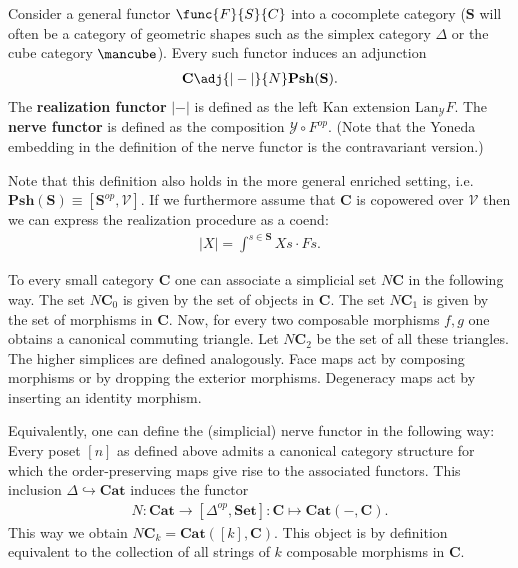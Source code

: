     \begin{construct}
        Consider a general functor $\func{F}{S}{C}$ into a cocomplete category ($\mathbf{S}$ will often be a category of geometric shapes such as the simplex category $\Delta$ or the cube category $\mbox{\mancube}$). Every such functor induces an adjunction
        \begin{gather}
            \mathbf{C}\adj{|-|}{N}\mathbf{Psh}(\mathbf{S}).
        \end{gather}
        The \textbf{realization functor} $|-|$ is defined as the left Kan extension $\text{Lan}_{\mathcal{Y}}F$. The \textbf{nerve functor} is defined as the composition $\mathcal{Y}\circ F^{op}$. (Note that the Yoneda embedding in the definition of the nerve functor is the contravariant version.)

        Note that this definition also holds in the more general enriched setting, i.e. $\mathbf{Psh}(\mathbf{S})\equiv[\mathbf{S}^{op}, \mathcal{V}]$. If we furthermore assume that $\mathbf{C}$ is copowered over $\mathcal{V}$ then we can express the realization procedure as a coend:
        \begin{gather}
            |X| = \int^{s\in\mathbf{S}}Xs\cdot Fs.
        \end{gather}
    \end{construct}

    \begin{example}\label{sheaf:nerve}
        To every small category \textbf{C} one can associate a simplicial set $N\mathbf{C}$ in the following way. The set $N\mathbf{C}_0$ is given by the set of objects in $\mathbf{C}$. The set $N\mathbf{C}_1$ is given by the set of morphisms in $\mathbf{C}$. Now, for every two composable morphisms $f, g$ one obtains a canonical commuting triangle. Let $N\mathbf{C}_2$ be the set of all these triangles. The higher simplices are defined analogously. Face maps act by composing morphisms or by dropping the exterior morphisms. Degeneracy maps act by inserting an identity morphism.

        Equivalently, one can define the (simplicial) nerve functor in the following way: Every poset $[n]$ as defined above admits a canonical category structure for which the order-preserving maps give rise to the associated functors. This inclusion $\Delta\hookrightarrow\mathbf{Cat}$ induces the functor
        \begin{gather}
            N:\textbf{Cat}\rightarrow[\Delta^{op}, \textbf{Set}]:\mathbf{C}\mapsto\mathbf{Cat}(-, \mathbf{C}).
        \end{gather}
        This way we obtain $N\mathbf{C}_k=\mathbf{Cat}([k], \mathbf{C})$. This object is by definition equivalent to the collection of all strings of $k$ composable morphisms in $\mathbf{C}$.
    \end{example}

